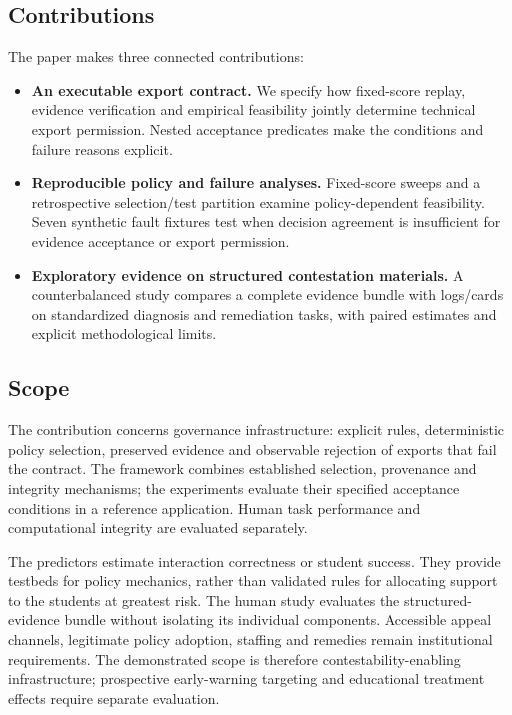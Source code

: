\subsection{Contributions}
The paper makes three connected contributions:
\begin{itemize}[leftmargin=*,noitemsep]
\item \textbf{An executable export contract.} We specify how fixed-score replay, evidence verification and empirical feasibility jointly determine technical export permission. Nested acceptance predicates make the conditions and failure reasons explicit.
\item \textbf{Reproducible policy and failure analyses.} Fixed-score sweeps and a retrospective selection/test partition examine policy-dependent feasibility. Seven synthetic fault fixtures test when decision agreement is insufficient for evidence acceptance or export permission.
\item \textbf{Exploratory evidence on structured contestation materials.} A counterbalanced study compares a complete evidence bundle with logs/cards on standardized diagnosis and remediation tasks, with paired estimates and explicit methodological limits.
\end{itemize}



\subsection{Scope}
The contribution concerns governance infrastructure: explicit rules, deterministic policy selection, preserved evidence and observable rejection of exports that fail the contract. The framework combines established selection, provenance and integrity mechanisms; the experiments evaluate their specified acceptance conditions in a reference application. Human task performance and computational integrity are evaluated separately.

The predictors estimate interaction correctness or student success. They provide testbeds for policy mechanics, rather than validated rules for allocating support to the students at greatest risk. The human study evaluates the structured-evidence bundle without isolating its individual components. Accessible appeal channels, legitimate policy adoption, staffing and remedies remain institutional requirements. The demonstrated scope is therefore contestability-enabling infrastructure; prospective early-warning targeting and educational treatment effects require separate evaluation.
